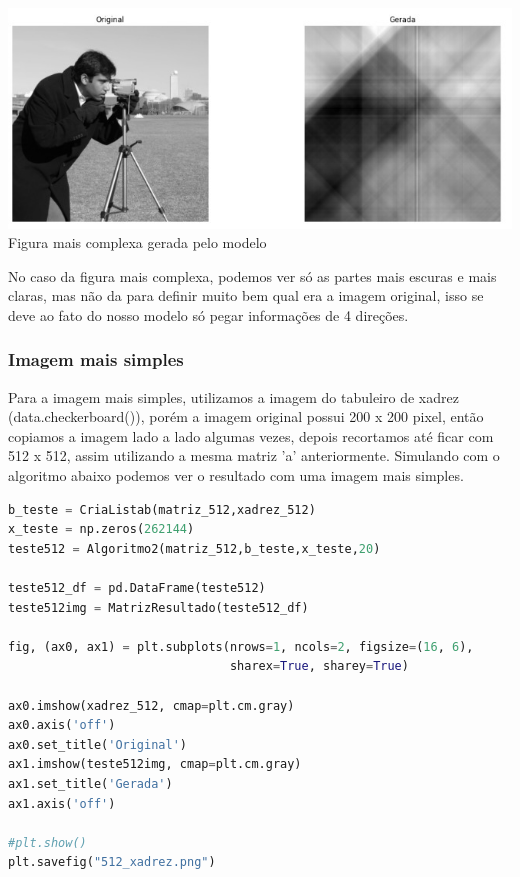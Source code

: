 \documentclass[a4paper, 12pt]{article}
\begin{document}
\begin{center}
    \includegraphics[width=16cm]{camera512.jpg}
    Figura mais complexa gerada pelo modelo
    
\end{center}

No caso da figura mais complexa, podemos ver só as partes mais escuras e mais claras, mas não da para definir muito bem qual era a imagem original, isso se deve ao fato do nosso modelo só pegar informações de 4 direções.

\subsubsection{Imagem mais simples}

Para a imagem mais simples, utilizamos a imagem do tabuleiro de xadrez (data.checkerboard()), porém a imagem original possui 200 x 200 pixel, então copiamos a imagem lado a lado algumas vezes, depois recortamos até ficar com 512 x 512, assim utilizando a mesma matriz 'a' anteriormente. Simulando com o algoritmo abaixo podemos ver o resultado com uma imagem mais simples.

\begin{lstlisting}[language=Python, caption = Imagem 512 x 512 mas simples]
b_teste = CriaListab(matriz_512,xadrez_512)
x_teste = np.zeros(262144)
teste512 = Algoritmo2(matriz_512,b_teste,x_teste,20)

teste512_df = pd.DataFrame(teste512)
teste512img = MatrizResultado(teste512_df)

fig, (ax0, ax1) = plt.subplots(nrows=1, ncols=2, figsize=(16, 6),
                               sharex=True, sharey=True)

ax0.imshow(xadrez_512, cmap=plt.cm.gray)
ax0.axis('off')
ax0.set_title('Original')
ax1.imshow(teste512img, cmap=plt.cm.gray)
ax1.set_title('Gerada')
ax1.axis('off')

#plt.show()
plt.savefig("512_xadrez.png")
\end{lstlisting}
\end{document}
